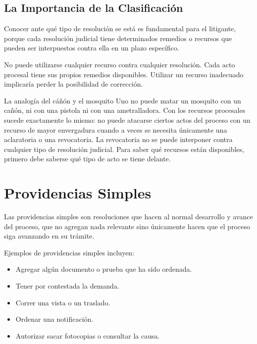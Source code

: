 \documentclass[12pt,oneside]{book}
\begin{document}
\subsection{La Importancia de la Clasificación}

Conocer ante qué tipo de resolución se está es fundamental para el litigante, porque cada resolución judicial tiene determinados remedios o recursos que pueden ser interpuestos contra ella en un plazo específico.

\begin{important}
No puede utilizarse cualquier recurso contra cualquier resolución. Cada acto procesal tiene sus propios remedios disponibles. Utilizar un recurso inadecuado implicaría perder la posibilidad de corrección.
\end{important}

\begin{example}{La analogía del cáñón y el mosquito}
Uno no puede matar un mosquito con un cañón, ni con una pistola ni con una ametralladora. Con los recursos procesales sucede exactamente lo mismo: no puede atacarse ciertos actos del proceso con un recurso de mayor envergadura cuando a veces se necesita únicamente una aclaratoria o una revocatoria. La revocatoria no se puede interponer contra cualquier tipo de resolución judicial. Para saber qué recursos están disponibles, primero debe saberse qué tipo de acto se tiene delante.
\end{example}

\section{Providencias Simples}

Las providencias simples son resoluciones que hacen al normal desarrollo y avance del proceso, que no agregan nada relevante sino únicamente hacen que el proceso siga avanzando en su trámite.

Ejemplos de providencias simples incluyen:

\begin{itemize}
    \item Agregar algún documento o prueba que ha sido ordenada.
    \item Tener por contestada la demanda.
    \item Correr una vista o un traslado.
    \item Ordenar una notificación.
    \item Autorizar sacar fotocopias o consultar la causa.
\end{itemize}
\end{document}
